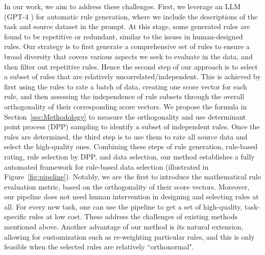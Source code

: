 \documentclass{article}
\begin{document}
In our work, we aim to address these challenges. First, we leverage an LLM (GPT-4 \citet{achiam2023gpt}) for automatic rule generation, where we include the descriptions of the task and source dataset in the prompt. At this stage, some generated rules are found to be repetitive or redundant, similar to the issues in human-designed rules. Our strategy is to first generate a comprehensive set of rules to ensure a broad diversity that covers various aspects we seek to evaluate in the data, and then filter out repetitive rules. Hence the second step of our approach is to select a subset of rules that are relatively uncorrelated/independent. This is achieved by first using the rules to rate a batch of data, creating one score vector for each rule, and then assessing the independence of rule subsets through the overall orthogonality of their corresponding score vectors. We propose the formula in Section~\ref{sec:Methodology} to measure the orthogonality and use determinant point process (DPP) sampling \citep{macchi1975coincidence, borodin2000distributions} to identify a subset of independent rules. Once the rules are determined, the third step is to use them to rate all source data and select the high-quality ones. Combining these steps of rule generation, rule-based rating, rule selection by DPP, and data selection, our method establishes a fully automated framework for rule-based data selection (illustrated in Figure~\ref{fig:pipeline}). Notably, we are the first to introduce the mathematical rule evaluation metric, based on the orthogonality of their score vectors. Moreover, our pipeline does not need human intervention in designing and selecting rules at all. For every new task, one can use the pipeline to get a set of high-quality, task-specific rules at low cost. These address the challenges of existing methods mentioned above. Another advantage of our method is its natural extension, allowing for customization such as re-weighting particular rules, and this is only feasible when the selected rules are relatively ``orthonormal". 
\end{document}
